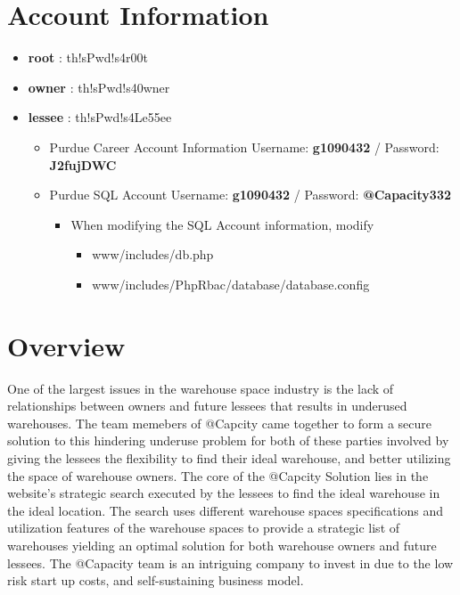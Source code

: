 \section*{Account Information}
\begin{itemize}
\item \textbf{root} : th!sPwd!s4r00t
\item \textbf{owner} : th!sPwd!s40wner
\item \textbf{lessee} : th!sPwd!s4Le55ee
\begin{itemize}
    \item Purdue Career Account Information Username: \textbf{g1090432} / Password: \textbf{J2fujDWC}
\item Purdue SQL Account Username: \textbf{g1090432} / Password: \textbf{@Capacity332}
\begin{itemize}
\item When modifying the SQL Account information, modify 
\begin{itemize}
\item www/includes/db.php
\item www/includes/PhpRbac/database/database.config

\end{itemize}

\end{itemize}
\end{itemize}
\end{itemize}

\newpage
\tableofcontents
\newpage
{}

\section{Overview}
One of the largest issues in the warehouse space industry is the lack of relationships between owners and future lessees that results in underused warehouses. The team memebers of @Capcity came together to form a secure solution to this hindering underuse problem for both of these parties involved by giving the lessees the flexibility to find their ideal warehouse, and better utilizing the space of warehouse owners. The core of the @Capcity Solution lies in the website's strategic search executed by the lessees to find the ideal warehouse in the ideal location. The search uses different warehouse spaces specifications and utilization features of the warehouse spaces to provide a strategic list of warehouses yielding an optimal solution for both warehouse owners and future lessees. The @Capacity team is an intriguing company to invest in due to the low risk start up costs, and self-sustaining business model. 

